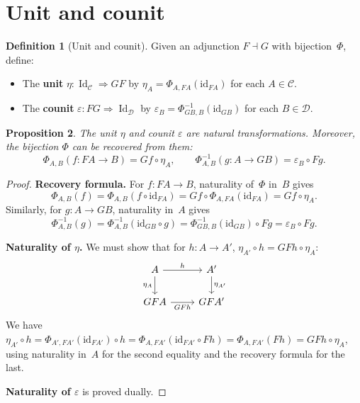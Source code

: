 \documentclass[a4paper,12pt]{book}
\DeclareMathOperator{\Id}{Id}
\newcommand{\id}{\mathrm{id}}
\theoremstyle{definition}
\newtheorem{definition}{Definition}[section]
\theoremstyle{plain}
\newtheorem{proposition}[definition]{Proposition}
\theoremstyle{remark}
\begin{document}
\section{Unit and counit}\label{sec:unit-counit}

\begin{definition}[Unit and counit]\label{def:unit-counit}
Given an adjunction $F\dashv G$ with bijection~$\Phi$, define:
\begin{itemize}
\item The \textbf{unit} $\eta\colon \Id_{\mathcal{C}}\Rightarrow GF$
    by $\eta_A = \Phi_{A,FA}(\id_{FA})$ for each $A\in\mathcal{C}$.
\item The \textbf{counit} $\varepsilon\colon FG\Rightarrow\Id_{\mathcal{D}}$
    by $\varepsilon_B = \Phi^{-1}_{GB,B}(\id_{GB})$ for each
    $B\in\mathcal{D}$.
\end{itemize}
\end{definition}

\begin{proposition}\label{prop:unit-counit-nat}
The unit $\eta$ and counit $\varepsilon$ are natural transformations.
Moreover, the bijection $\Phi$ can be recovered from them:
\[
    \Phi_{A,B}(f\colon FA\to B) = Gf\circ\eta_A,
    \qquad
    \Phi^{-1}_{A,B}(g\colon A\to GB) = \varepsilon_B\circ Fg.
\]
\end{proposition}

\begin{proof}
\textbf{Recovery formula.}
For $f\colon FA\to B$, naturality of~$\Phi$ in~$B$ gives
\[
    \Phi_{A,B}(f) = \Phi_{A,B}(f\circ\id_{FA})
    = Gf\circ\Phi_{A,FA}(\id_{FA}) = Gf\circ\eta_A.
\]
Similarly, for $g\colon A\to GB$, naturality in~$A$ gives
\[
    \Phi^{-1}_{A,B}(g)
    = \Phi^{-1}_{A,B}(\id_{GB}\circ g)
    = \Phi^{-1}_{GB,B}(\id_{GB})\circ Fg
    = \varepsilon_B\circ Fg.
\]

\textbf{Naturality of $\eta$.}
We must show that for $h\colon A\to A'$, $\eta_{A'}\circ h = GFh\circ\eta_A$:
\[
\begin{tikzcd}
A \arrow[r, "h"] \arrow[d, "\eta_A"'] & A' \arrow[d, "\eta_{A'}"] \\
GFA \arrow[r, "GFh"'] & GFA'
\end{tikzcd}
\]
We have $\eta_{A'}\circ h = \Phi_{A',FA'}(\id_{FA'})\circ h
= \Phi_{A,FA'}(\id_{FA'}\circ Fh) = \Phi_{A,FA'}(Fh)
= GFh\circ\eta_A$, using naturality in~$A$ for the second
equality and the recovery formula for the last.

\textbf{Naturality of $\varepsilon$} is proved dually.
\end{proof}
\end{document}
